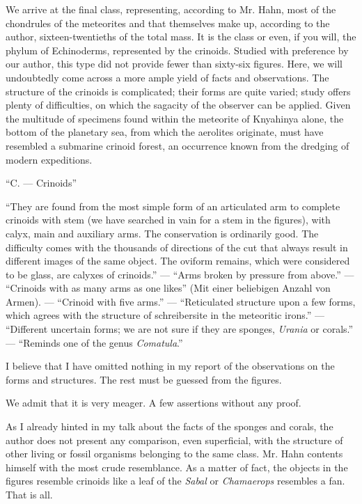 \documentclass[a4paper, 12pt, oneside]{article}
\begin{document}
We arrive at the final class, representing, according to Mr. Hahn, most of the chondrules of the meteorites and that themselves make up, according to the author, sixteen-twentieths of the total mass. It is the class or even, if you will, the phylum of Echinoderms, represented by the crinoids. Studied with preference by our author, this type did not provide fewer than sixty-six figures. Here, we will undoubtedly come across a more ample yield of facts and observations. The structure of the crinoids is complicated; their forms are quite varied; study offers plenty of difficulties, on which the sagacity of the observer can be applied. Given the multitude of specimens found within the meteorite of Knyahinya alone, the bottom of the planetary sea, from which the aerolites originate, must have resembled a submarine crinoid forest, an occurrence known from the dredging of modern expeditions.

``C. --- Crinoids''

``They are found from the most simple form of an articulated arm to complete crinoids with stem (we have searched in vain for a stem in the figures), with calyx, main and auxiliary arms. The conservation is ordinarily good. The difficulty comes with the thousands of directions of the cut that always result in different images of the same object. The oviform remains, which were considered to be glass, are calyxes of crinoids.'' --- ``Arms broken by pressure from above.'' --- ``Crinoids with as many arms as one likes'' (Mit einer beliebigen Anzahl von Armen). --- ``Crinoid with five arms.'' --- ``Reticulated structure upon a few forms, which agrees with the structure of schreibersite in the meteoritic irons.'' --- ``Different uncertain forms; we are not sure if they are sponges, \emph{Urania} or corals.'' --- ``Reminds one of the genus \emph{Comatula}.''

I believe that I have omitted nothing in my report of the observations on the forms and structures. The rest must be guessed from the figures.

We admit that it is very meager. A few assertions without any proof.

As I already hinted in my talk about the facts of the sponges and corals, the author does not present any comparison, even superficial, with the structure of other living or fossil organisms belonging to the same class. Mr. Hahn contents himself with the most crude resemblance. As a matter of fact, the objects in the figures resemble crinoids like a leaf of the \emph{Sabal} or \emph{Chamaerops} resembles a fan. That is all.
\end{document}
